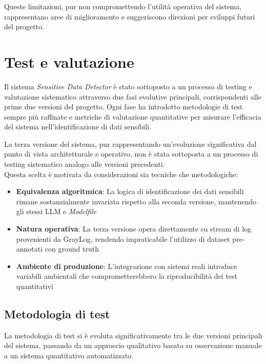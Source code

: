 \documentclass[12pt]{report}
\begin{document}
Queste limitazioni, pur non compromettendo l'utilità operativa del sistema, rappresentano aree di miglioramento e suggeriscono direzioni per sviluppi futuri del progetto.



%
%

\chapter{Test e valutazione}
\label{chap:test}

Il sistema \textit{Sensitive Data Detector} è stato sottoposto a un processo di testing e valutazione sistematico attraverso due fasi evolutive principali, corrispondenti alle prime due versioni del progetto. Ogni fase ha introdotto metodologie di test sempre più raffinate e metriche di valutazione quantitative per misurare l'efficacia del sistema nell'identificazione di dati sensibili.

La terza versione del sistema, pur rappresentando un'evoluzione significativa dal punto di vista architetturale e operativo, non è stata sottoposta a un processo di testing sistematico analogo alle versioni precedenti. \\
Questa scelta è motivata da considerazioni sia tecniche che metodologiche:

\begin{itemize}
    \item \textbf{Equivalenza algoritmica}: La logica di identificazione dei dati sensibili rimane sostanzialmente invariata rispetto alla seconda versione, mantenendo gli stessi LLM e \textit{Modelfile}
    \item \textbf{Natura operativa}: La terza versione opera direttamente su stream di log provenienti da GrayLog, rendendo impraticabile l'utilizzo di dataset pre-annotati con ground truth
    \item \textbf{Ambiente di produzione}: L'integrazione con sistemi reali introduce variabili ambientali che comprometterebbero la riproducibilità dei test quantitativi
\end{itemize}

\section{Metodologia di test}
\label{sec:metodologia_test}

La metodologia di test si è evoluta significativamente tra le due versioni principali del sistema, passando da un approccio qualitativo basato su osservazione manuale a un sistema quantitativo automatizzato.
\end{document}
